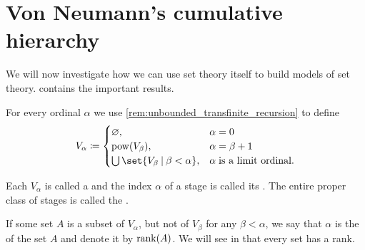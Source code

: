 \section{Von Neumann's cumulative hierarchy}\label{sec:von_neumanns_cumulative_hierarchy}

We will now investigate how we can use set theory itself to build models of set theory.  contains the important results.

\begin{definition}\label{def:cumulative_hierarchy}
  For every ordinal \( \alpha \) we use \cref{rem:unbounded_transfinite_recursion} to define
  \begin{equation}\label{eq:def:cumulative_hierarchy}
    V_\alpha \coloneqq \begin{cases}
      \varnothing,                                  &\alpha = 0 \\
      \pow(V_\beta),                                &\alpha = \beta + 1 \\
      \bigcup\set{ V_\beta \given \beta < \alpha }, &\alpha \T{is a limit ordinal.}
    \end{cases}
  \end{equation}

  Each \( V_\alpha \) is called a  and the index \( \alpha \) of a stage is called its . The entire proper class of stages is called the .

  If some set \( A \) is a subset of \( V_\alpha \), but not of \( V_\beta \) for any \( \beta < \alpha \), we say that \( \alpha \) is the  of the set \( A \) and denote it by \( \operatorname{rank}(A) \). We will see in  that every set has a rank.
\end{definition}

